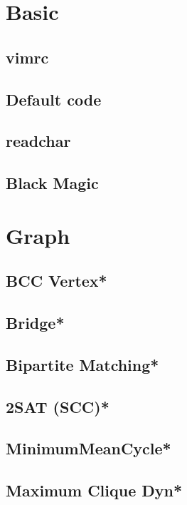 \section{Basic}
\subsection{vimrc}

\subsection{Default code}

\subsection{readchar}

\subsection{Black Magic}


\section{Graph}
\subsection{BCC Vertex*} %

\subsection{Bridge*} %

\subsection{Bipartite Matching*} %

\subsection{2SAT (SCC)*} %

\subsection{MinimumMeanCycle*} %

\subsection{Maximum Clique Dyn*} %
 
